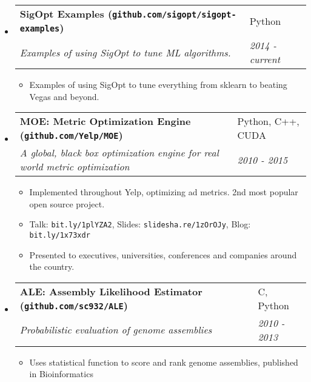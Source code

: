 \documentclass[letterpaper, 11pt]{article}
\makeatletter
\newcommand{\entry}[4]{%
  \begin{tabularx}{\linewidth}{@{}Xl@{}}
    \textbf{#1} & #2          \\
    \textit{#3} & \textit{#4} \\
  \end{tabularx}
}
\makeatother
\begin{document}
\begin{itemize}

\item
    \entry{SigOpt Examples (\texttt{github.com/sigopt/sigopt-examples})}{Python}{Examples of using SigOpt to tune ML algorithms.}{2014 - current}
    \begin{itemize}
        \item{Examples of using SigOpt to tune everything from sklearn to beating Vegas and beyond.}
	\end{itemize}

\item
    \entry{MOE: Metric Optimization Engine (\texttt{github.com/Yelp/MOE})}{Python, C++, CUDA}{A global, black box optimization engine for real world metric optimization}{2010 - 2015}
    \begin{itemize}
        \item{Implemented throughout Yelp, optimizing ad metrics. 2nd most popular open source project.}
        \item{Talk: \texttt{bit.ly/1plYZA2}, Slides: \texttt{slidesha.re/1zOrOJy}, Blog: \texttt{bit.ly/1x73xdr}}
        \item{Presented to executives, universities, conferences and companies around the country.}
	\end{itemize}

\item
    \entry{ALE: Assembly Likelihood Estimator (\texttt{github.com/sc932/ALE})}{C, Python}{Probabilistic evaluation of genome assemblies}{2010 - 2013}
    \begin{itemize}
        \item{Uses statistical function to score and rank genome assemblies, published in Bioinformatics}
	\end{itemize}

\end{itemize}
\end{document}
